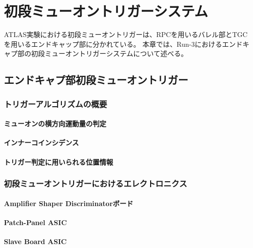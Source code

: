 \chapter{初段ミューオントリガーシステム}\label{chapter3}
ATLAS実験における初段ミューオントリガーは、RPCを用いるバレル部とTGCを用いるエンドキャップ部に分かれている。
本章では、Run-3におけるエンドキャプ部の初段ミューオントリガーシステムについて述べる。

\section{エンドキャプ部初段ミューオントリガー}

\subsection{トリガーアルゴリズムの概要}\label{section:CW}

\subsubsection{ミューオンの横方向運動量の判定}

\subsubsection{インナーコインシデンス}\label{innnercoin}

\subsubsection{トリガー判定に用いられる位置情報}

\subsection{初段ミューオントリガーにおけるエレクトロニクス}

\subsubsection{Amplifier Shaper Discriminatorボード}

\subsubsection{Patch-Panel ASIC}

\subsubsection{Slave Board ASIC}

